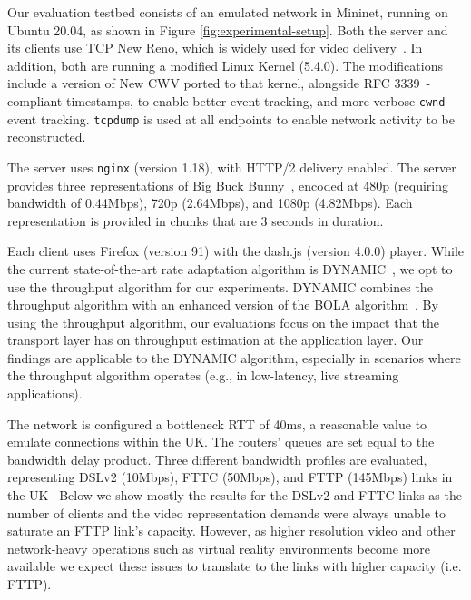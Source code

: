 \documentclass[10pt,sigconf,anonymous]{acmart}
\begin{document}
Our evaluation testbed consists of an emulated network in Mininet, running on Ubuntu 20.04, as shown in Figure \ref{fig:experimental-setup}. Both the server and its clients use TCP New Reno, which is widely used for video delivery~\cite{Mishra-2019-the-great-internet-tcp-congestion-control-census}. In addition, both are running a modified Linux Kernel (5.4.0). The modifications include a version of New CWV ported to that kernel, alongside RFC 3339~\cite{rfc3339-precise-timestamps}-compliant timestamps, to enable better event tracking, and more verbose \texttt{cwnd} event tracking. \texttt{tcpdump} is used at all endpoints to enable network activity to be reconstructed.

The server uses \texttt{nginx} (version 1.18), with HTTP/2 delivery enabled. The server provides three representations of Big Buck Bunny~\cite{online-bbb}, encoded at 480p (requiring bandwidth of 0.44Mbps), 720p (2.64Mbps), and 1080p (4.82Mbps). Each representation is provided in chunks that are 3 seconds in duration.

Each client uses Firefox (version 91) with the dash.js (version 4.0.0) player. While the current state-of-the-art rate adaptation algorithm is DYNAMIC~\cite{Spiteri-2019-from-theory-to-practice-sabre}, we opt to use the throughput algorithm for our experiments. DYNAMIC combines the throughput algorithm with an enhanced version of the BOLA algorithm~\cite{Spiteri-2016-BOLA}. By using the throughput algorithm, our evaluations focus on the impact that the transport layer has on throughput estimation at the application layer. Our findings are applicable to the DYNAMIC algorithm, especially in scenarios where the throughput algorithm operates (e.g., in low-latency, live streaming applications).

The network is configured a bottleneck RTT of 40ms, a reasonable value to emulate connections within the UK. The routers' queues are set equal to the bandwidth delay product. Three different bandwidth profiles are evaluated, representing DSLv2 (10Mbps), FTTC (50Mbps), and FTTP (145Mbps) links in the UK~\cite{online-ofcom-report} Below we show mostly the results for the DSLv2 and FTTC links as the number of clients and the video representation demands were always unable to saturate an FTTP link's capacity. However, as higher resolution video and other network-heavy operations such as virtual reality environments become more available we expect these issues to translate to the links with higher capacity (i.e. FTTP).
\end{document}
